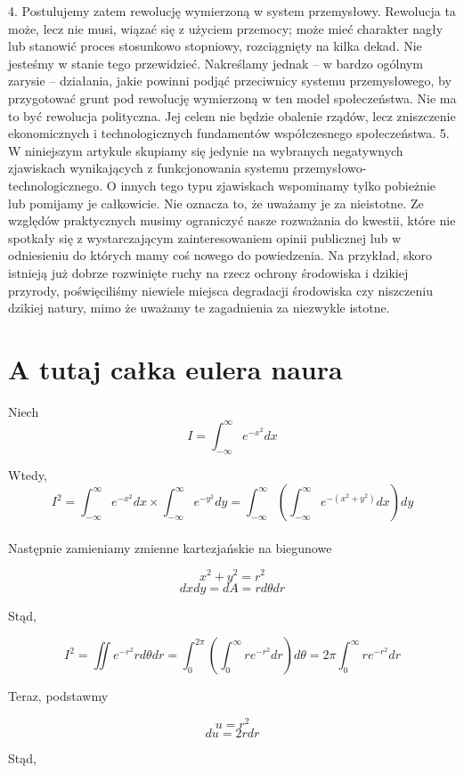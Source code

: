 \documentclass[11pt]{article}
\theoremstyle{definition}
\theoremstyle{plain}
\theoremstyle{remark}
\begin{document}
4. Postulujemy zatem rewolucję wymierzoną w system przemysłowy. Rewolucja ta może, lecz nie musi, wiązać się z użyciem przemocy; może mieć charakter nagły lub stanowić proces stosunkowo stopniowy, rozciągnięty na kilka dekad. Nie jesteśmy w stanie tego przewidzieć. Nakreślamy jednak – w bardzo ogólnym zarysie – działania, jakie powinni podjąć przeciwnicy systemu przemysłowego, by przygotować grunt pod rewolucję wymierzoną w ten model społeczeństwa. Nie ma to być rewolucja polityczna. Jej celem nie będzie obalenie rządów, lecz zniszczenie ekonomicznych i technologicznych fundamentów współczesnego społeczeństwa. 5. W niniejszym artykule skupiamy się jedynie na wybranych negatywnych zjawiskach wynikających z funkcjonowania systemu przemysłowo-technologicznego. O innych tego typu zjawiskach wspominamy tylko pobieżnie lub pomijamy je całkowicie. Nie oznacza to, że uważamy je za nieistotne. Ze względów praktycznych musimy ograniczyć nasze rozważania do kwestii, które nie spotkały się z wystarczającym zainteresowaniem opinii publicznej lub w odniesieniu do których mamy coś nowego do powiedzenia. Na przykład, skoro istnieją już dobrze rozwinięte ruchy na rzecz ochrony środowiska i dzikiej przyrody, poświęciliśmy niewiele miejsca degradacji środowiska czy niszczeniu dzikiej natury, mimo że uważamy te zagadnienia za niezwykle istotne.

\newpage

\section*{A tutaj całka eulera naura}

Niech $$I = \int_{-\infty}^{\infty} e^{-x^2} dx$$

Wtedy, $$I^2 = \int_{-\infty}^{\infty} e^{-x^2} dx \times \int_{-\infty}^{\infty} e^{-y^2} dy = \int_{-\infty}^{\infty} (\int_{-\infty}^{\infty} e^{-(x^2 + y^2)} dx) dy$$
\\

Następnie zamieniamy zmienne kartezjańskie na biegunowe

$$x^2 + y^2 = r^2 $$$$ dxdy = dA = rd\theta dr$$

Stąd, 

$$ I^2 = \iint e^{-r^2} rd\theta dr = \int_{0}^{2\pi} (\int_{0}^{\infty} re^{-r^2} dr) d\theta = 2\pi \int_{0}^{\infty} re^{-r^2} dr$$ 

Teraz, podstawmy

$$ u = r^2 $$$$ du = 2rdr$$

Stąd,
\end{document}
